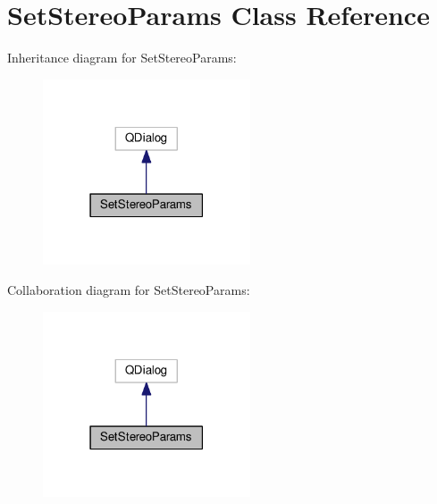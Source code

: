 \hypertarget{class_set_stereo_params}{}\section{Set\+Stereo\+Params Class Reference}
\label{class_set_stereo_params}


Inheritance diagram for Set\+Stereo\+Params\+:
\nopagebreak
\begin{figure}[H]
\begin{center}
\leavevmode
\includegraphics[width=174pt]{class_set_stereo_params__inherit__graph}
\end{center}
\end{figure}


Collaboration diagram for Set\+Stereo\+Params\+:
\nopagebreak
\begin{figure}[H]
\begin{center}
\leavevmode
\includegraphics[width=174pt]{class_set_stereo_params__coll__graph}
\end{center}
\end{figure}
